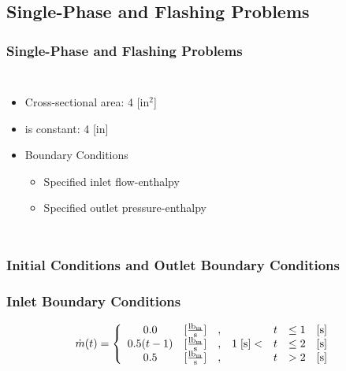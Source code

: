 \documentclass[compress,xcolor=table]{beamer}
\begin{document}
\subsection[Single-Phase and Flashing]{Single-Phase and Flashing Problems}
\begin{frame}
\frametitle{Single-Phase and Flashing Problems}
\begin{columns}

\begin{itemize}
\item{Cross-sectional area: 4 [in$^2$]}
\item{\dx{} is constant: 4 [in]}
\item{ Boundary Conditions
	\begin{itemize}
	\item{Specified inlet flow-enthalpy}
	\item{Specified outlet pressure-enthalpy}
\end{itemize}
}
\end{itemize}

\begin{figure}[h!t]
\centering
\resizebox{\textwidth}{0.6\textheight}{

}

\end{figure}
\end{columns}
\end{frame}
\begin{frame}
\frametitle{Initial Conditions and Outlet Boundary Conditions}

\begin{table}[ht]
\centering

\end{table}

\end{frame}
\begin{frame}
\frametitle{Inlet Boundary Conditions}

\begin{table}[ht]
\centering

\end{table}

\begin{equation*}
\label{eqn:bc_time_func_single}
\dot{m}(t) = \left\{
\begin{array}{cclrcll}
 0.0           & [\frac{ \lbm{} }{\text{s}}] & , &                & t & \leq 1 & [\text{s}] \\
 0.5 ( t - 1)  & [\frac{ \lbm{} }{\text{s}}] & , & 1\; [\text{s}] < & t & \leq 2 & [\text{s}] \\
 0.5           & [\frac{ \lbm{} }{\text{s}}] & , &                & t & > 2    & [\text{s}]
\end{array}\right.
\end{equation*}

\end{frame}
\end{document}
